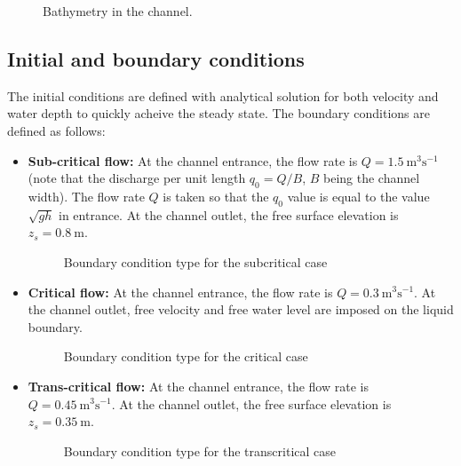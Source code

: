 \begin{figure}[H]
 \centering
 \caption{Bathymetry in the channel.}
 \label{t2d:bumpsub:fig:baty}
\end{figure}

\subsection{Initial and boundary conditions}
The initial conditions are defined with analytical solution for both velocity and water depth to quickly acheive the steady state.
The boundary conditions are defined as follows:
\begin{itemize}
\item {\bf Sub-critical flow:} 
At the channel entrance, the flow rate is $Q =  1.5~\text{m}^3\text{s}^{-1}$
(note that the discharge per unit length $q_0=Q/B$, $B$ being the channel width).
The flow rate $Q$ is taken so that the $q_0$ value is equal to the value
$\sqrt{gh}$ in entrance. At the channel outlet, the free surface elevation is $ z_{s} = 0.8~\text{m}$.

\begin{figure}[!htbp]
 \centering
 \caption{Boundary condition type for the subcritical case}
 \label{t2d:bumpsub:fig:bc}
\end{figure}

\item {\bf Critical flow:}
At the channel entrance, the flow rate is $Q = 0.3~\text{m}^3\text{s}^{-1}$.
At the channel outlet, free velocity and free water level are imposed on the liquid boundary.

\begin{figure}[!htbp]
 \centering
 \caption{Boundary condition type for the critical case}
 \label{t2d:bumpcri:fig:bc}
\end{figure}

\item {\bf Trans-critical flow:}
At the channel entrance, the flow rate is $Q = 0.45~\text{m}^3\text{s}^{-1}$.
At the channel outlet, the free surface elevation is $z_{s} = 0.35~\text{m}$.

\begin{figure}[!htbp]
 \centering
 \caption{Boundary condition type for the transcritical case}
 \label{t2d:bumptrans:fig:bc}
\end{figure}

\end{itemize}


